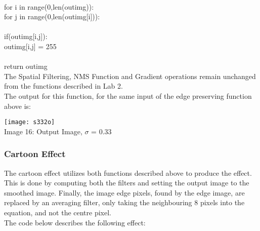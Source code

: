 \documentclass{article}
\begin{document}
	\\
	\indent for i in range(0,len(out\textunderscore img)):\\
	\indent \indent for j in range(0,len(out\textunderscore img[i])):\\
	\\
	\indent \indent \indent if(out\textunderscore img[i,j]):\\
	\indent \indent \indent \indent out\textunderscore img[i,j] = 255\\
	\\
	\indent return out\textunderscore img\\
	
	The Spatial Filtering, NMS Function and Gradient operations remain unchanged from the functions described in Lab 2.\\
	
	The output for this function, for the same input of the edge preserving function above is:\\
	
	\begin{center}
		
		\texttt{[image: s332o]}\\
		Image 16: Output Image, $\sigma$ = 0.33\\
		
	\end{center}

	\subsubsection{Cartoon Effect}

	The cartoon effect utilizes both functions described above to produce the effect. This is done by computing both the filters and setting the output image to the smoothed image. Finally, the image edge pixels, found by the edge image, are replaced by an averaging filter, only taking the neighbouring 8 pixels into the equation, and not the centre pixel.\\
	
	The code below describes the following effect:\\
	
\end{document}
